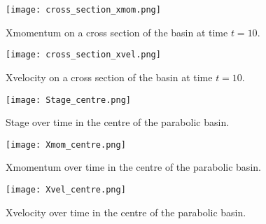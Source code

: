 \begin{figure}
\begin{center}
\texttt{[image: cross\_section\_xmom.png]}
\caption{Xmomentum on a cross section of the basin at time $t=10$.}
\label{fig:cross_section_xmom}
\end{center}
\end{figure}

\begin{figure}
\begin{center}
\texttt{[image: cross\_section\_xvel.png]}
\caption{Xvelocity on a cross section of the basin at time $t=10$.}
\label{fig:cross_section_xvel}
\end{center}
\end{figure}




\begin{figure}
\begin{center}
\texttt{[image: Stage\_centre.png]}
\caption{Stage over time in the centre of the parabolic basin.}
\label{fig:Stage_centre}
\end{center}
\end{figure}

\begin{figure}
\begin{center}
\texttt{[image: Xmom\_centre.png]}
\caption{Xmomentum over time in the centre of the parabolic basin.}
\label{fig:Xmom_centre}
\end{center}
\end{figure}

\begin{figure}
\begin{center}
\texttt{[image: Xvel\_centre.png]}
\caption{Xvelocity over time in the centre of the parabolic basin.}
\label{fig:Xvel_centre}
\end{center}
\end{figure}


\endinput
